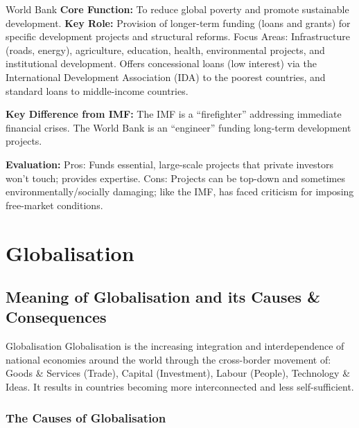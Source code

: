 \documentclass[11pt, a4paper, twoside]{book}
\begin{document}
\begin{keyterm}{World Bank}
\textbf{Core Function:} To reduce global poverty and promote sustainable development. \textbf{Key Role:} Provision of longer-term funding (loans and grants) for specific development projects and structural reforms. Focus Areas: Infrastructure (roads, energy), agriculture, education, health, environmental projects, and institutional development. Offers concessional loans (low interest) via the International Development Association (IDA) to the poorest countries, and standard loans to middle-income countries.
\end{keyterm}

\begin{coreidea}
\textbf{Key Difference from IMF:} The IMF is a ``firefighter'' addressing immediate financial crises. The World Bank is an ``engineer'' funding long-term development projects.
\end{coreidea}

\textbf{Evaluation:} Pros: Funds essential, large-scale projects that private investors won't touch; provides expertise. Cons: Projects can be top-down and sometimes environmentally/socially damaging; like the IMF, has faced criticism for imposing free-market conditions.

\section{Globalisation}

\subsection{Meaning of Globalisation and its Causes \& Consequences}

\begin{keyterm}{Globalisation}
Globalisation is the increasing integration and interdependence of national economies around the world through the cross-border movement of: Goods \& Services (Trade), Capital (Investment), Labour (People), Technology \& Ideas. It results in countries becoming more interconnected and less self-sufficient.
\end{keyterm}

\subsubsection{The Causes of Globalisation}
\end{document}
